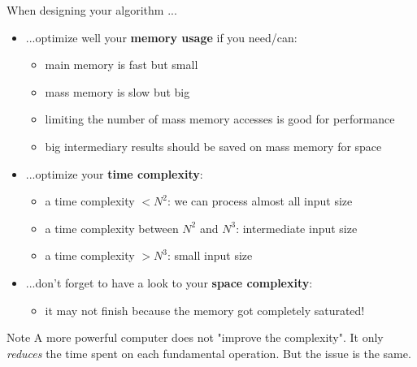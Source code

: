 \documentclass{beamer}[10pt, usepdftitle=false, handout]
\begin{document}
	\begin{frame}
		
	When designing your algorithm ...
	\begin{itemize}
	\item {...optimize well your \textbf{memory usage} if you need/can:
		\begin{itemize}
			\item {main memory is fast but small}
			\item {mass memory is slow but big}
			\item {limiting the number of mass memory accesses is good for performance}
			\item {big intermediary results should be saved on mass memory for space}
				
		\end{itemize}			
	}
	
	\item {...optimize your \textbf{time complexity}:
		\begin{itemize}
			\item {a time complexity $< N^2$: we can process almost all input size}
			\item {a time complexity between $N^2$ and $N^3$: intermediate input size}
			\item {a time complexity $> N^3$: small input size}		
		\end{itemize}		
	}
	\item {...don't forget to have a look to your \textbf{space complexity}:
		\begin{itemize}
			\item {it may not finish because the memory got completely saturated!}
		\end{itemize}
	}			
	\end{itemize}	
	
	\begin{alertblock}{Note}
	A more powerful computer does not "improve the complexity". It only \textit{reduces} the time spent on each fundamental operation. But the issue is the same.
	\end{alertblock}

	
	\end{frame}

	
\end{document}
